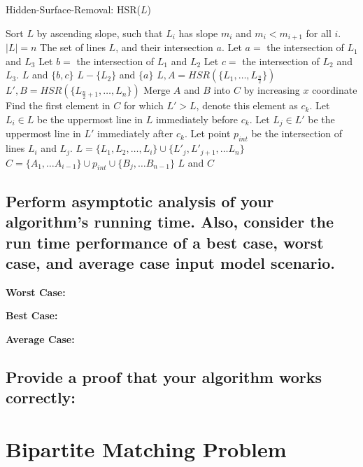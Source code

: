 \documentclass{article}
\begin{document}
\begin{algorithm}
\caption{Hidden-Surface-Removal:  HSR($L$)}
\begin{algorithmic}
\State Sort $L$ by ascending slope, such that $L_i$ has slope $m_i$ and $m_i < m_{i+1}$ for all $i$.
\State $|L| = n$
	\State \Return The set of lines $L$, and their intersection $a$.
	\State Let $a =$ the intersection of $L_1$ and $L_3$
	\State Let $b =$ the intersection of $L_1$ and $L_2$
		\State Let $c =$ the intersection of $L_2$ and $L_3$.
		\State \Return $L$ and $\{b, c\}$
	\Else 
		\State \Return $L - \{L_2\}$ and $\{a\}$
	\EndIf
\Else
	\State $L, A = HSR(\{L_1, \dots , L_{\frac{n}{2}}\})$
	\State $L', B = HSR(\{L_{\frac{n}{2}+1}, \dots , L_n\})$
\EndIf
\State Merge $A$ and $B$ into $C$ by increasing $x$ coordinate
\State Find the first element in $C$ for which $L' > L$, denote this element as $c_k$.
\State Let $L_i \in L$ be the uppermost line in $L$ immediately before $c_k$.
\State Let $L_j \in L'$ be the uppermost line in $L'$ immediately after $c_k$.
\State Let point $p_{int}$ be the intersection of lines $L_i$ and $L_j$.
\State $L = \{L_1, L_2, \dots, L_i\} \cup \{L'_j, L'_{j+1}, \dots L_n \}$
\State $C = \{A_1, \dots A_{i-1} \} \cup p_{int} \cup \{B_j, \dots B_{n-1} \}$
\State \Return $L$ and $C$
\end{algorithmic}
\end{algorithm}

\subsection{Perform asymptotic analysis of your algorithm's running time.  Also, consider the run time performance of a best case, worst case, and average case input model scenario.}

\noindent \textbf{Worst Case:}

\noindent \textbf{Best Case:}

\noindent \textbf{Average Case:}

\subsection{Provide a proof that your algorithm works correctly:}

\newpage

\section{Bipartite Matching Problem}
\end{document}
